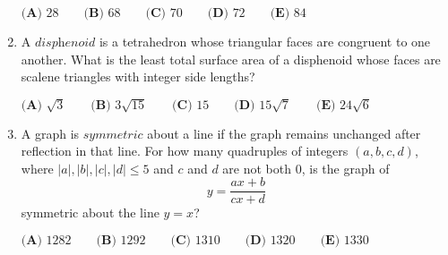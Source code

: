 \documentclass{article}
\begin{document}
\begin{enumerate}[label=\arabic*., itemsep=0.5em]
$\textbf{(A) } 28 \qquad \textbf{(B) } 68 \qquad \textbf{(C) } 70 \qquad \textbf{(D) } 72 \qquad \textbf{(E) } 84$\par \vspace{0.5em}\item A $\textit{disphenoid}$ is a tetrahedron whose triangular faces are congruent to one another. What is the least total surface area of a disphenoid whose faces are scalene triangles with integer side lengths?

$\textbf{(A) }\sqrt{3}\qquad\textbf{(B) }3\sqrt{15}\qquad\textbf{(C) }15\qquad\textbf{(D) }15\sqrt{7}\qquad\textbf{(E) }24\sqrt{6}$\par \vspace{0.5em}\item A graph is $\textit{symmetric}$ about a line if the graph remains unchanged after reflection in that line. For how many quadruples of integers $(a,b,c,d)$, where $|a|,|b|,|c|,|d|\le5$ and $c$ and $d$ are not both $0$, is the graph of 
\begin{equation*}
y=\frac{ax+b}{cx+d}
\end{equation*}
symmetric about the line $y=x$?

$\textbf{(A) }1282\qquad\textbf{(B) }1292\qquad\textbf{(C) }1310\qquad\textbf{(D) }1320\qquad\textbf{(E) }1330$\par \vspace{0.5em}\end{enumerate}
\end{document}

